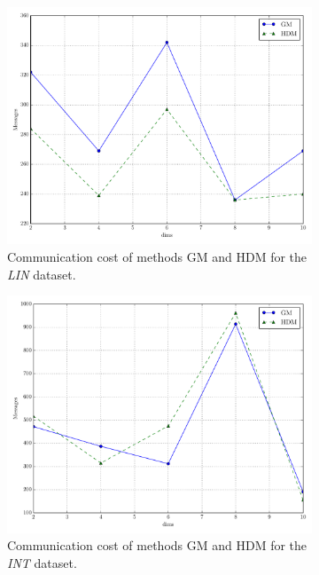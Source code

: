 \begin{figure}[!h]
\begin{subfigure}{0.32\textwidth}
  \includegraphics[width=\linewidth]{img/main_msg_linear_dims.pdf}
  \caption{Communication cost of methods GM and HDM for the \emph{LIN} dataset.}
\end{subfigure}\hfill
\begin{subfigure}{0.32\textwidth}
  \includegraphics[width=\linewidth]{img/main_msg_interweaving_dims.pdf}
  \caption{Communication cost of methods GM and HDM for the \emph{INT} dataset.}
\end{subfigure}\hfill
\begin{subfigure}{0.32\textwidth}%

\end{subfigure}
\end{figure}
